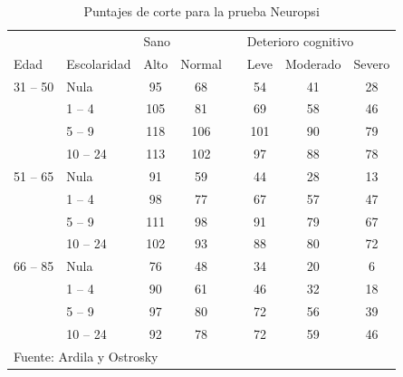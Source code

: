 \documentclass[12pt,letterpaper,draft]{book}
\begin{document}
\begin{table}
\centering
\caption{Puntajes de corte para la prueba Neuropsi}
\begin{tabular}{llccrccc}
\toprule
&& \multicolumn{2}{l}{Sano} & \phantom{.} & \multicolumn{3}{l}{Deterioro cognitivo} \\
\cmidrule{3-4} \cmidrule{6-8} 
Edad & Escolaridad & Alto & Normal && Leve & Moderado & Severo\\
\midrule
31 -- 50  
& Nula     & 95  & 68  &  & 54  & 41 & 28 \\
& 1 -- 4   & 105 & 81  &  & 69  & 58 & 46 \\
& 5 -- 9   & 118 & 106 &  & 101 & 90 & 79 \\
& 10 -- 24 & 113 & 102 &  & 97  & 88 & 78 \\
\midrule
51 -- 65  
& Nula     & 91  & 59  &  & 44  & 28 & 13 \\
& 1 -- 4   & 98  & 77  &  & 67  & 57 & 47 \\
& 5 -- 9   & 111 & 98  &  & 91  & 79 & 67 \\
& 10 -- 24 & 102 & 93  &  & 88  & 80 & 72 \\
\midrule
66 -- 85  
& Nula     & 76  & 48  &  & 34  & 20 & 6 \\
& 1 -- 4   & 90  & 61  &  & 46  & 32 & 18 \\
& 5 -- 9   & 97  & 80  &  & 72  & 56 & 39 \\
& 10 -- 24 & 92  & 78  &  & 72  & 59 & 46 \\
\bottomrule
\multicolumn{7}{l}{Fuente: Ardila y Ostrosky \cite{Ardila12}}
\end{tabular}
\label{anexo:neuropsi}
\end{table}
\end{document}
